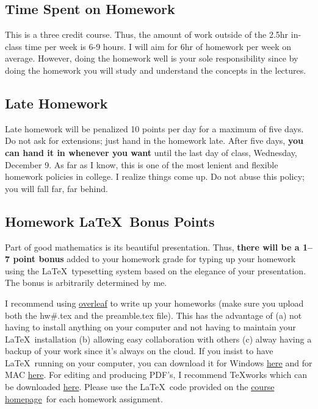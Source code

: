 \documentclass[12pt]{article}
\newcommand{\ingreen}[1]{\color{green}\textbf{#1} \color{black}}
\newcommand{\coursewebpage}{\href{https://github.com/kapelner/QC_Math_369_Fall_2020}{course homepage}}
\begin{document}
\subsection*{Time Spent on Homework }

This is a three credit course. Thus, the amount of work outside of the 2.5hr in-class time per week is 6-9 hours. I will aim for 6hr of homework per week on average. However, doing the homework well is your sole responsibility since by doing the homework you will study and understand the concepts in the lectures.

\subsection*{Late Homework}

Late homework will be penalized 10 points per day for a maximum of five days. Do not ask for extensions; just hand in the homework late. After five days, \textbf{you can hand it in whenever you want} until the last day of class, Wednesday, December 9. As far as I know, this is one of the most lenient and flexible homework policies in college. I realize things come up. Do not abuse this policy; you will fall far, far behind.

\subsection*{Homework \LaTeX~Bonus Points}

Part of good mathematics is its beautiful presentation. Thus, \ingreen{there will be a 1--7 point bonus} added to your homework grade  for typing up your homework using the \LaTeX ~typesetting system based on the elegance of your presentation. The bonus is arbitrarily determined by me.

I recommend using \href{http://overleaf.com}{overleaf} to write up your homeworks (make sure you upload both the hw\#.tex and the preamble.tex file). This has the advantage of (a) not having to install anything on your computer and not having to maintain your \LaTeX ~installation (b) allowing easy collaboration with others (c) alway having a backup of your work since it's always on the cloud. If you insist to have \LaTeX ~running on your computer, you can download it for Windows \href{http://www.miktex.org/download}{here} and for MAC \href{http://www.tug.org/mactex/}{here}. For editing and producing PDF's, I recommend \TeX works which can be downloaded \href{http://www.tug.org/texworks/#Getting_TeXworks}{here}. Please use the \LaTeX ~code provided on the \coursewebpage ~for each homework assignment. 
\end{document}
